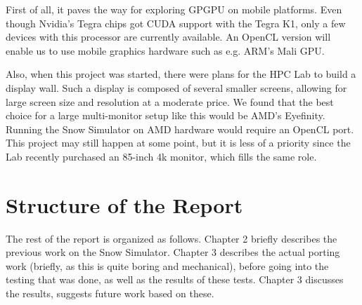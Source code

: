 First of all, it paves the way for exploring GPGPU on mobile platforms. Even though Nvidia's Tegra chips got CUDA support with the Tegra K1, only a few devices with this processor are currently available. An OpenCL version will enable us to use mobile graphics hardware such as e.g. ARM's Mali GPU.

Also, when this project was started, there were plans for the HPC Lab to build a display wall. Such a display is composed of several smaller screens, allowing for large screen size and resolution at a moderate price. We found that the best choice for a large multi-monitor setup like this would be AMD's Eyefinity. Running the Snow Simulator on AMD hardware would require an OpenCL port. This project may still happen at some point, but it is less of a priority since the Lab recently purchased an 85-inch 4k monitor, which fills the same role.

\section{Structure of the Report}
The rest of the report is organized as follows. Chapter 2 briefly describes the previous work on the Snow Simulator. Chapter 3 describes the actual porting work (briefly, as this is quite boring and mechanical), before going into the testing that was done, as well as the results of these tests. Chapter 3 discusses the results, suggests future work based on these.